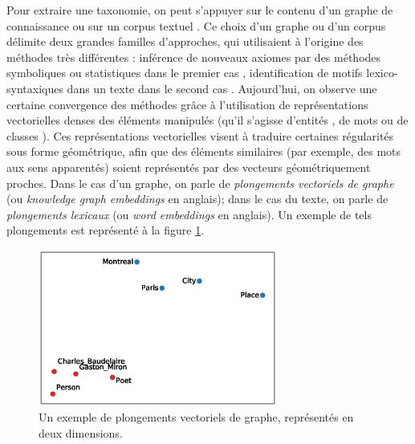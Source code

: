Pour extraire une taxonomie, on peut s'appuyer sur le contenu d'un graphe de connaissance \cite{cimiano2004conceptual, zhang2019new, volker2011statistical, zhang2019iteratively, ristoski2017large} ou sur un corpus textuel
\cite{wu2008automatically, shwartz-etal-2017-hypernyms, fu2014learning, gupta2016domain, atzori2020fully, pocostales-2016-nuig}. Ce choix d'un graphe ou d'un corpus délimite deux grandes familles d'approches, qui utilisaient à l'origine des méthodes très différentes :
inférence de nouveaux axiomes par des méthodes symboliques ou statistiques dans le premier cas \cite{cimiano2004conceptual, volker2011statistical},  identification de motifs lexico-syntaxiques dans un texte dans le second cas \cite{hearst1992automatic, roller-etal-2018-hearst}. Aujourd'hui, 
on observe une certaine convergence des méthodes grâce à l'utilisation de représentations vectorielles denses des éléments manipulés (qu'il s'agisse d'entités \cite{bordes2013translating}, de mots \cite{mikolov2013distributed} ou de classes \cite{lv2018differentiating}). Ces représentations vectorielles visent à traduire certaines régularités sous forme géométrique, afin que des éléments similaires (par exemple, des mots aux sens apparentés) soient représentés par des vecteurs géométriquement proches. Dans le cas d'un graphe, on parle de \textit{plongements vectoriels de graphe} (ou \textit{knowledge graph embeddings} en anglais); dans le cas du texte, on parle de \textit{plongements lexicaux} (ou \textit{word embeddings} en anglais). Un exemple de tels plongements est représenté à la figure \ref{fig:intro-embeddings}.

%

\begin{figure}[h]
    \centering
    \includegraphics[width=0.7\textwidth]{img/embedding_pca_transe2.eps}
    \caption[Exemple de plongements vectoriels]{
    Un exemple de plongements vectoriels de graphe, représentés en deux dimensions\footnotemark.}
    \label{fig:intro-embeddings}
\end{figure}

